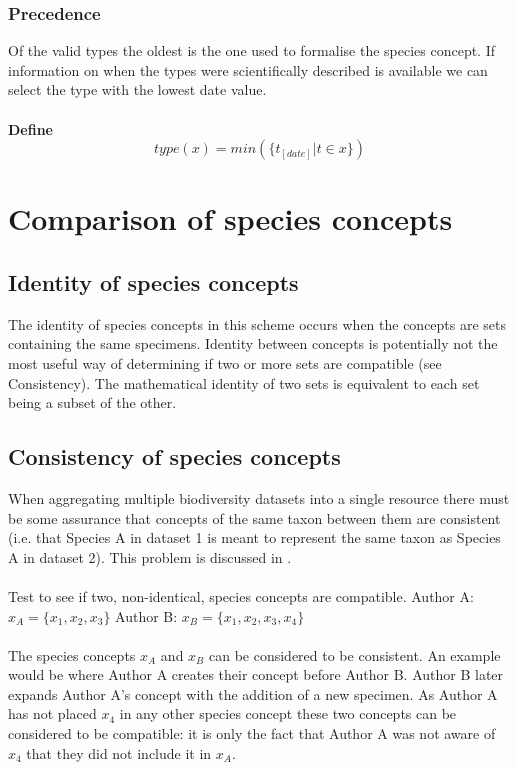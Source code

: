 \documentclass{article}
\begin{document}
   \subsubsection{Precedence}
   Of the valid types the oldest is the one used to formalise the species concept. If information on when the types were scientifically described is available we can select the type with the lowest date value.
   \paragraph{}
   \textbf{Define}
   \[type(x) = min(\{t_{[date]}|t \in x\}) \]
   
   \section{Comparison of species concepts}
   \subsection{Identity of species concepts}
   The identity of species concepts in this scheme occurs when the concepts are sets containing the same specimens. Identity between concepts is potentially not the most useful way of determining if two or more sets are compatible (see Consistency). The mathematical identity of two sets is equivalent to each set being a subset of the other.

   \subsection{Consistency of species concepts}
   When aggregating multiple biodiversity datasets into a single resource there must be some assurance that concepts of the same taxon between them are consistent (i.e. that Species A in dataset 1 is meant to represent the same taxon as Species A in dataset 2). This problem is discussed in \cite{thau2010,franz2014}.
   \paragraph{}
   Test to see if two, non-identical, species concepts are compatible.
   \newline\newline
   Author A: $x_A = \{x_1, x_2, x_3\}$ \newline
   Author B: $x_B = \{x_1, x_2, x_3, x_4\}$ 
   \paragraph{}
   The species concepts $x_A$ and $x_B$ can be considered to be consistent. An example would be where Author A creates their concept before Author B. Author B later expands Author A's concept with the addition of a new specimen. As Author A has not placed $x_4$ in any other species concept these two concepts can be considered to be compatible: it is only the fact that Author A was not aware of $x_4$ that they did not include it in $x_A$.
\end{document}

